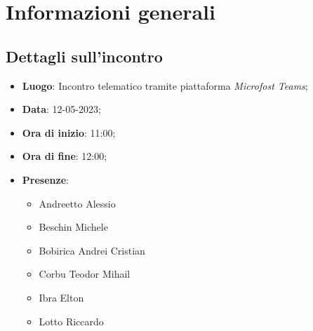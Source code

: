 \section{Informazioni generali}

\subsection{Dettagli sull'incontro}
\begin{itemize}
\item \textbf{Luogo}: Incontro telematico tramite piattaforma \textit{Microfost Teams\glo};
\item \textbf{Data}: 12-05-2023;
\item \textbf{Ora di inizio}: 11:00;
\item \textbf{Ora di fine}: 12:00;
\item \textbf{Presenze}: 
\begin{itemize}
	\item Andreetto Alessio
    \item Beschin Michele
    \item Bobirica Andrei Cristian
    \item Corbu Teodor Mihail
    \item Ibra Elton
    \item Lotto Riccardo
\end{itemize}
\end{itemize}



